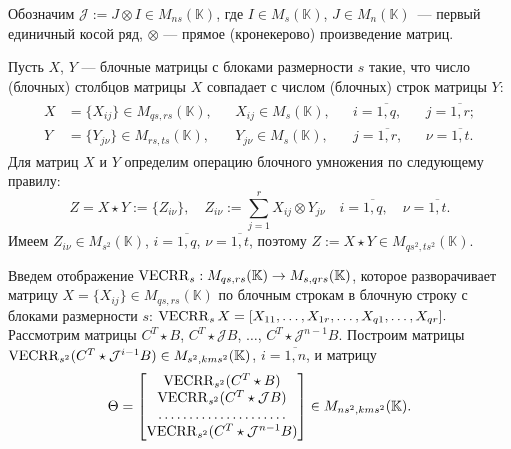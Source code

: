 Обозначим  $\mathcal{J}:=J\otimes I\in M_{ns}(\mathbb{K})$, где
$I\in M_s(\mathbb{K})$, $J\in M_n(\mathbb{K})$~--- первый единичный
косой ряд, $\otimes$ --- прямое (кронекерово) произведение матриц. 

Пусть $X$, $Y$ --- блочные
матрицы с блоками размерности $s$ такие, что число (блочных)
столбцов матрицы $X$ совпадает с числом (блочных) строк матрицы $Y$:
\begin{gather*}
\begin{aligned}
X&=\{X_{ij}\}\in M_{qs,rs}(\mathbb{K}), && X_{ij}\in M_s(\mathbb{K}), && i=\overline{1,q}, && j=\overline{1,r}; \\
Y&=\{Y_{j\nu}\}\in M_{rs,ts}(\mathbb{K}), && Y_{j \nu}\in
M_s(\mathbb{K}), && j=\overline{1,r}, && \nu=\overline{1,t}.
\end{aligned}
\end{gather*}
 Для матриц $X$ и $Y$ определим операцию блочного умножения по следующему правилу:
$$
Z=X \star Y:=\{Z_{i\nu}\}, \quad Z_{i\nu}:=\sum_{j=1}^r
X_{ij}\otimes Y_{j \nu} \quad i=\overline{1,q},  \quad
\nu=\overline{1,t}.
$$
Имеем $Z_{i\nu}\in M_{s^2}(\mathbb{K})$, $i=\overline{1,q}$,
$\nu=\overline{1,t}$, поэтому $Z:=X \star Y \in M_{qs^2,
ts^2}(\mathbb{K})$. 

Введем отображение %
${\rm VECRR}_s:M_{qs,rs}(\mathbb{K})\to M_{s,qrs}(\mathbb{K})$,
которое разворачивает матрицу $X=\{X_{ij}\}\in
M_{qs,rs}(\mathbb{K})$ по
блочным строкам 
в блочную строку с блоками размерности $s$:
$
{\rm VECRR}_s\,X=[X_{11},\ldots,X_{1r},\ldots,X_{q1},\ldots,X_{qr}].
$
 Рассмотрим матрицы
$C^T\star B$, $C^T\star \mathcal{J}B$, $\ldots$, 
$C^T\star \mathcal{J}^{n-1}B$.
Построим матрицы ${\rm VECRR}_{s^2}(C^T\star \mathcal{J}^{i-1}B) \in
M_{s^2,kms^2}(\mathbb{K})$, $i=\overline{1,n}$, и матрицу
\begin{equation*}\label{030}
\Theta=\left[\begin{matrix}
{\rm VECRR}_{s^2}(C^T\star B)\\
{\rm VECRR}_{s^2}(C^T\star \mathcal{J}B)\\
\ldots\ldots\ldots\ldots\ldots\ldots\ldots \\
{\rm VECRR}_{s^2}(C^T\star \mathcal{J}^{n-1}B)
\end{matrix}\right]\in M_{ns^2,kms^2}(\mathbb{K}).
\end{equation*}


